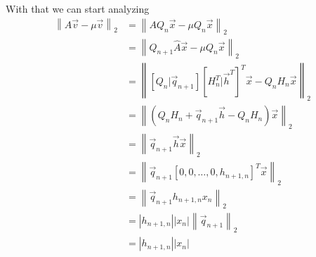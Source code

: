 \documentclass[10pt]{article}
\newcommand{\normt}[1]{\left\lVert#1\right\rVert_2}
\def\q#1{\vec{q}_{#1}}
\begin{document}
  With that we can start analyzing
\begin{align*} 
   \normt{A \vec{v} - \mu \vec{v}}  & = \normt{AQ_n\vec{x} -\mu Q_n\vec{x} } \\ 
                                    & = \normt{Q_{n+1} \hat{A}\vec{x}-\mu Q_n\vec{x} }\\
                                    & = \normt{ [ Q_n |\q{n+1} ][ H_n^T|\vec{h}^T]^T \vec{x} -Q_n H_n\vec{x} } \\
                                    & = \normt{ \left( Q_n H_n + \q{n+1}\vec{h} -Q_n H_n\right)\vec{x}} \\
                                    & =  \normt{ \q{n+1}\vec{h} \vec{x}}\\
                                    & = \normt{ \q{n+1}[0,0,\dots,0,h_{n+1,n}]^T\vec{x}} \\
                                    & = \normt{ \q{n+1} h_{n+1,n}x_n}  \\
                                    & = | h_{n+1,n}| |x_n| \normt{\q{n+1}} \\
                                    & = | h_{n+1,n}| |x_n|
\end{align*} 
\end{document}
